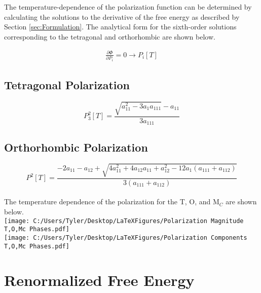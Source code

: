 \documentclass{article}
\begin{document}
The temperature-dependence of the polarization function can be determined by calculating the solutions to the derivative of the free energy as described by Section \ref{sec:Formulation}.  The analytical form for the sixth-order solutions corresponding to the tetragonal and orthorhombic are shown below.

\begin{align}
\frac{\partial \Phi}{\partial P_i}=0 \to P_i[T]
\end{align}

\subsection{Tetragonal Polarization}
\begin{equation}
P_3^2[T]=\frac{\sqrt{a_{11}^2-3 a_1 a_{111}}-a_{11}}{3 a_{111}}
\end{equation}

\subsection{Orthorhombic Polarization}
\begin{equation}
P^2[T]=\frac{-2 a_{11}-a_{12}+\sqrt{4 a_{11}^2+4 a_{12} a_{11}+a_{12}^2-12 a_1 \left(a_{111}+a_{112}\right)}}{3(a_{111}+a_{112})}
\end{equation} \\

The temperature dependence of the polarization for the T, O, and M$_C$ are shown below. \\
\texttt{[image: C:/Users/Tyler/Desktop/LaTeXFigures/Polarization Magnitude T,O,Mc Phases.pdf]} \\
\texttt{[image: C:/Users/Tyler/Desktop/LaTeXFigures/Polarization Components T,O,Mc Phases.pdf]}


\newpage
\section{Renormalized Free Energy}
\end{document}
